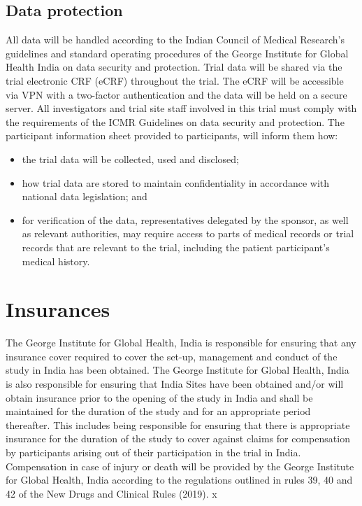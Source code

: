 \documentclass[
]{scrartcl}
\providecommand{\tightlist}{%
  \setlength{\itemsep}{0pt}\setlength{\parskip}{0pt}}\usepackage{longtable,booktabs,array}
\begin{document}
\subsection{Data protection}\label{data-protection}

All data will be handled according to the Indian Council of Medical
Research's guidelines and standard operating procedures of the George
Institute for Global Health India on data security and protection. Trial
data will be shared via the trial electronic CRF (eCRF) throughout the
trial. The eCRF will be accessible via VPN with a two-factor
authentication and the data will be held on a secure server. All
investigators and trial site staff involved in this trial must comply
with the requirements of the ICMR Guidelines on data security and
protection. The participant information sheet provided to participants,
will inform them how:

\begin{itemize}
\tightlist
\item
  the trial data will be collected, used and disclosed;
\item
  how trial data are stored to maintain confidentiality in accordance
  with national data legislation; and
\item
  for verification of the data, representatives delegated by the
  sponsor, as well as relevant authorities, may require access to parts
  of medical records or trial records that are relevant to the trial,
  including the patient participant's medical history.
\end{itemize}

\section{Insurances}\label{insurances}

The George Institute for Global Health, India is responsible for
ensuring that any insurance cover required to cover the set-up,
management and conduct of the study in India has been obtained. The
George Institute for Global Health, India is also responsible for
ensuring that India Sites have been obtained and/or will obtain
insurance prior to the opening of the study in India and shall be
maintained for the duration of the study and for an appropriate period
thereafter. This includes being responsible for ensuring that there is
appropriate insurance for the duration of the study to cover against
claims for compensation by participants arising out of their
participation in the trial in India. Compensation in case of injury or
death will be provided by the George Institute for Global Health, India
according to the regulations outlined in rules 39, 40 and 42 of the New
Drugs and Clinical Rules (2019). x
\end{document}
